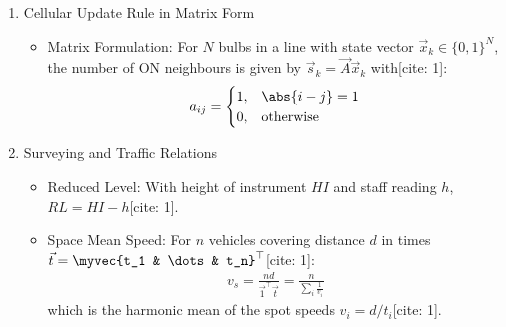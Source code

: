 \begin{enumerate}[label=\thesubsection.\arabic*, ref=\thesubsection.\theenumi,itemsep=0pt]
\item Cellular Update Rule in Matrix Form
\begin{itemize}
\item Matrix Formulation:
For $N$ bulbs in a line with state vector $\vec{x}_k \in \{0, 1\}^N$, the number of ON neighbours is given by $\vec{s}_k = \vec{A}\vec{x}_k$ with[cite: 1]:
\begin{align}
a_{ij} = \begin{cases} 1, & \abs{i - j} = 1 \\ 0, & \text{otherwise} \end{cases}
\end{align}
\end{itemize}

\item Surveying and Traffic Relations
\begin{itemize}
\item Reduced Level:
With height of instrument $HI$ and staff reading $h$, $RL = HI - h$[cite: 1].
\item Space Mean Speed:
For $n$ vehicles covering distance $d$ in times $\vec{t} = \myvec{t_1 & \dots & t_n}^\top$[cite: 1]:
\begin{align}
v_s = \frac{nd}{\vec{1}^\top \vec{t}} = \frac{n}{\sum_i \frac{1}{v_i}}
\end{align}
which is the harmonic mean of the spot speeds $v_i = d / t_i$[cite: 1].
\end{itemize}

\end{enumerate}

